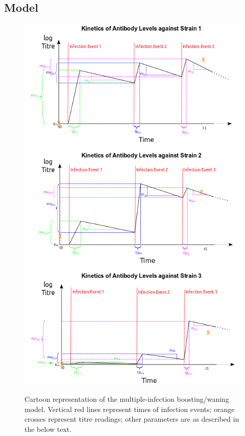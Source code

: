 \documentclass[a4paper,11pt,twoside]{article}
\begin{document}
\subsection{Model}
\begin{figure}[h!]
\begin{center}
\includegraphics[scale=0.7]{model_cartoon.png}\\
\caption{Cartoon representation of the multiple-infection boosting/waning model. Vertical red lines represent times of infection events; orange crosses represent titre readings; other parameters are as described in the below text.}
\end{center}
\end{figure}
\end{document}
